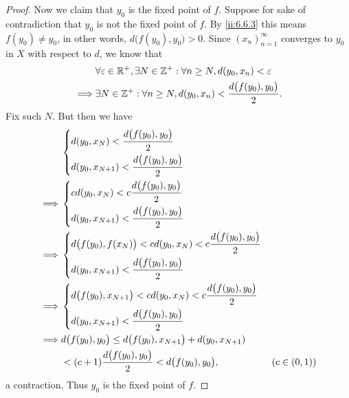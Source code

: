 \begin{proof}
  Now we claim that \(y_0\) is the fixed point of \(f\).
  Suppose for sake of contradiction that \(y_0\) is not the fixed point of \(f\).
  By \cref{ii:6.6.3} this means \(f(y_0) \neq y_0\), in other words, \(d\big(f(y_0), y_0\big) > 0\).
  Since \((x_n)_{n = 1}^\infty\) converges to \(y_0\) in \(X\) with respect to \(d\), we know that
  \begin{align*}
             & \forall \varepsilon \in \mathbb{R}^+, \exists N \in \mathbb{Z}^+ : \forall n \geq N, d(y_0, x_n) < \varepsilon \\
    \implies & \exists N \in \mathbb{Z}^+ : \forall n \geq N, d(y_0, x_n) < \dfrac{d\big(f(y_0), y_0\big)}{2}.
  \end{align*}
  Fix such \(N\).
  But then we have
  \begin{align*}
             & \begin{dcases}
                 d(y_0, x_N) < \dfrac{d\big(f(y_0), y_0\big)}{2} \\
                 d(y_0, x_{N + 1}) < \dfrac{d\big(f(y_0), y_0\big)}{2}
               \end{dcases}                                                   \\
    \implies & \begin{dcases}
                 c d(y_0, x_N) < c \dfrac{d\big(f(y_0), y_0\big)}{2} \\
                 d(y_0, x_{N + 1}) < \dfrac{d\big(f(y_0), y_0\big)}{2}
               \end{dcases}                                                   \\
    \implies & \begin{dcases}
                 d\big(f(y_0), f(x_N)\big) < c d(y_0, x_N) < c \dfrac{d\big(f(y_0), y_0\big)}{2} \\
                 d(y_0, x_{N + 1}) < \dfrac{d\big(f(y_0), y_0\big)}{2}
               \end{dcases}                        \\
    \implies & \begin{dcases}
                 d\big(f(y_0), x_{N + 1}\big) < c d(y_0, x_N) < c \dfrac{d\big(f(y_0), y_0\big)}{2} \\
                 d(y_0, x_{N + 1}) < \dfrac{d\big(f(y_0), y_0\big)}{2}
               \end{dcases}                     \\
    \implies & d\big(f(y_0), y_0\big) \leq d\big(f(y_0), x_{N + 1}\big) + d(y_0, x_{N + 1})                           \\
             & < (c + 1) \dfrac{d\big(f(y_0), y_0\big)}{2} < d\big(f(y_0), y_0\big),                 & (c \in (0, 1))
  \end{align*}
  a contraction.
  Thus \(y_0\) is the fixed point of \(f\).
\end{proof}

